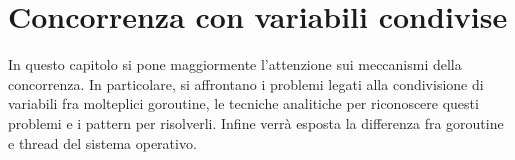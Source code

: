 \documentclass[../thesis.tex]{subfiles}
\begin{document}
    \newpage


    \section{Concorrenza con variabili condivise}\label{sec:concorrenza-con-variabili-condivise}
    In questo capitolo si pone maggiormente l'attenzione sui meccanismi della concorrenza.
    In particolare, si affrontano i problemi legati alla condivisione di variabili fra molteplici goroutine, le tecniche analitiche per riconoscere questi problemi e i pattern per risolverli.
    Infine verrà esposta la differenza fra goroutine e thread del sistema operativo.
    
    
    
    
    
    \clearpage
\end{document}
